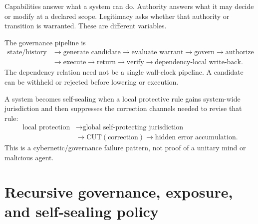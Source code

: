 Capabilities answer what a system can do. Authority answers what it may decide or modify at a declared scope. Legitimacy asks whether that authority or transition is warranted. These are different variables.

The governance pipeline is
\begin{equation}
\begin{aligned}
\text{state/history}&\rightarrow\text{generate candidate}\rightarrow\text{evaluate warrant}\rightarrow\text{govern}\rightarrow\text{authorize}\\
&\rightarrow\text{execute}\rightarrow\text{return}\rightarrow\text{verify}\rightarrow\text{dependency-local write-back}.
\end{aligned}
\end{equation}
The dependency relation need not be a single wall-clock pipeline. A candidate can be withheld or rejected before lowering or execution.

A system becomes self-sealing when a local protective rule gains system-wide jurisdiction and then suppresses the correction channels needed to revise that rule:
\begin{align}
\text{local protection}
&\rightarrow\text{global self-protecting jurisdiction}\nonumber\\
&\rightarrow\mathrm{CUT}(\text{correction})\rightarrow\text{hidden error accumulation}.
\end{align}
This is a cybernetic/governance failure pattern, not proof of a unitary mind or malicious agent.

\section{Recursive governance, exposure, and self-sealing policy}
\label{sec:deep-governance}


